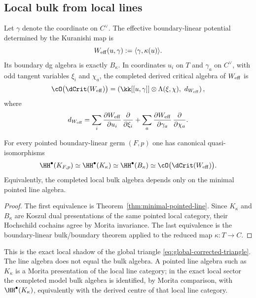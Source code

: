 \subsection{Local bulk from local lines}

Let $\gamma$ denote the coordinate on $C^\vee$. The effective boundary-linear potential determined by the Kuranishi map is
\[
W_{\mathrm{eff}}(u,\gamma):=\langle \gamma,\kappa(u)\rangle.
\]
Its boundary dg algebra is exactly $B_\kappa$.
In coordinates \(u_i\) on \(T\) and \(\gamma_a\) on \(C^\vee\), with
odd tangent variables \(\xi_i\) and \(\chi_a\), the completed derived
critical algebra of \(W_{\mathrm{eff}}\) is
\begin{equation}\label{eq:weff-derived-critical-dga}
\cO\bigl(\dCrit(W_{\eff})\bigr)
=
\left(
\kk[[u,\gamma]]\ot\Lambda(\xi,\chi),
\ d_{W_{\eff}}
\right),
\end{equation}
where
\begin{equation}\label{eq:weff-derived-critical-differential}
d_{W_{\mathrm{eff}}}
=
\sum_i
\frac{\partial W_{\mathrm{eff}}}{\partial u_i}\,
\frac{\partial}{\partial \xi_i}
+
\sum_a
\frac{\partial W_{\mathrm{eff}}}{\partial \gamma_a}\,
\frac{\partial}{\partial \chi_a}.
\end{equation}

\begin{theorem}\label{thm:local-bulk-line}
For every pointed boundary-linear germ $(F,p)$ one has canonical quasi-isomorphisms
\[
\HH^\bullet(K_{F,p})
\simeq
\HH^\bullet(K_\kappa)
\simeq
\HH^\bullet(B_\kappa)
\simeq
\cO\bigl(\dCrit(W_{\eff})\bigr).
\]
Equivalently, the completed local bulk algebra depends only on the minimal pointed line algebra.
\end{theorem}

\begin{proof}
The first equivalence is Theorem~\ref{thm:minimal-pointed-line}. Since $K_\kappa$ and $B_\kappa$ are Koszul dual presentations of the same pointed local category, their Hochschild cochains agree by Morita invariance. The last equivalence is the boundary-linear bulk/boundary theorem applied to the reduced map $\kappa:T\to C$.
\end{proof}

\begin{remark}
This is the exact local shadow of the global triangle
\eqref{eq:global-corrected-triangle}. The line algebra does not equal
the bulk algebra. A pointed line algebra such as \(K_\kappa\) is a
Morita presentation of the local line category; in the exact local
sector the completed model bulk algebra is identified, by Morita
comparison, with \(\HH^\bullet(K_\kappa)\), equivalently with the
derived centre of that local line category.
\end{remark}

